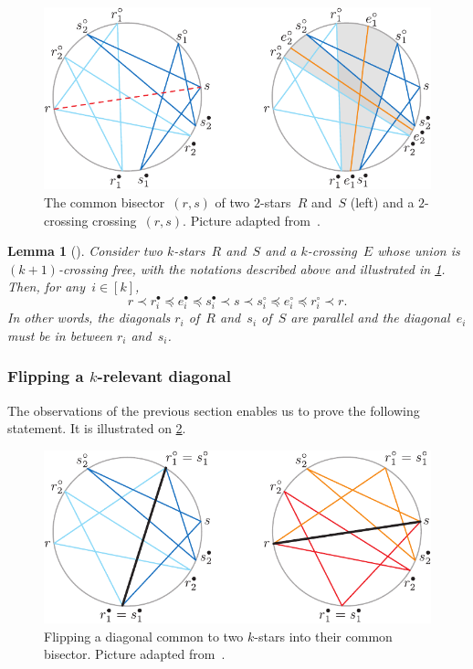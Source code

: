 \documentclass{amsart}
\newtheorem{lemma}[theorem]{Lemma}
\theoremstyle{remark}
\newcommand{\cl}{\prec}
\newcommand{\cle}{\preccurlyeq}
\begin{document}
\begin{figure}
	\capstart
	\centerline{\includegraphics[scale=.8]{combisector}}
	\caption{The common bisector~$(r,s)$ of two $2$-stars~$R$ and~$S$ (left) and a $2$-crossing crossing~$(r,s)$. Picture adapted from~\cite[Fig.~4]{PilaudSantos-multitriangulations}.}
	\label{fig:combisector}
\end{figure}

\begin{lemma}[{\cite[Lems.~3.6 \& 3.7]{PilaudSantos-multitriangulations}}]
\label{lem:crossingCommonBisector}
Consider two $k$-stars~$R$ and~$S$ and a $k$-crossing~$E$ whose union is $(k+1)$-crossing free, with the notations described above and illustrated in \cref{fig:combisector}. Then, for any~$i \in [k]$,
\[
r \cl r^\bullet_i \cle e^\bullet_i \cle s^\bullet_i \cl s \cl s^\circ_i \cle e^\circ_i  \cle r^\circ_i \cl r.
\]
In other words, the diagonals $r_i$ of~$R$ and~$s_i$ of~$S$ are parallel and the diagonal~$e_i$ must be in between $r_i$ and~$s_i$.
\end{lemma}


\subsubsection{Flipping a $k$-relevant diagonal}

The observations of the previous section enables us to prove the following statement.
It is illustrated on \cref{fig:flip}.


\begin{figure}
	\capstart
	\centerline{\includegraphics[scale=.8]{flip}}
	\caption{Flipping a diagonal common to two $k$-stars into their common bisector. Picture adapted from~\cite[Fig.~5]{PilaudSantos-multitriangulations}.}
	\label{fig:flip}
\end{figure}
\end{document}

